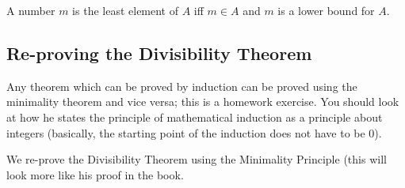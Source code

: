 \documentclass[12pt]{article}
\begin{document}
A number $m$ is the least element of $A$ iff $m \in A$ and $m$ is a lower bound for $A$.

\subsection{Re-proving the Divisibility Theorem}

Any theorem which can be proved by induction can be proved using the minimality theorem and vice versa;  this is a homework exercise.  You should look at how he states the principle of mathematical induction as a principle about integers (basically, the starting point of the induction does not have to be 0).

We re-prove the Divisibility Theorem using the Minimality Principle (this will look more like his proof in the book.
\end{document}
